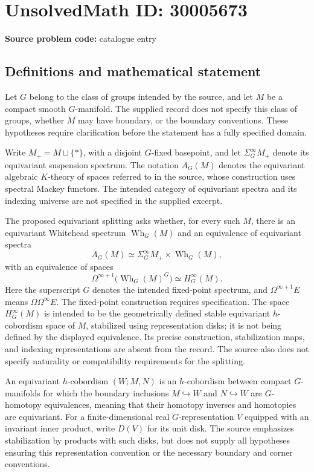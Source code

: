 \documentclass[11pt]{article}
\begin{document}
\section*{UnsolvedMath ID: 30005673}
\textbf{Source problem code:} catalogue entry
\subsection{Definitions and mathematical statement}
Let \(G\) belong to the class of groups intended by the source, and let \(M\) be a compact smooth \(G\)-manifold. The supplied record does not specify this class of groups, whether \(M\) may have boundary, or the boundary conventions. These hypotheses require clarification before the statement has a fully specified domain.

Write \(M_+=M\sqcup\{*\}\), with a disjoint \(G\)-fixed basepoint, and let \(\Sigma_G^\infty M_+\) denote its equivariant suspension spectrum. The notation \(A_G(M)\) denotes the equivariant algebraic \(K\)-theory of spaces referred to in the source, whose construction uses spectral Mackey functors. The intended category of equivariant spectra and its indexing universe are not specified in the supplied excerpt.

The proposed equivariant splitting asks whether, for every such \(M\), there is an equivariant Whitehead spectrum \(\operatorname{Wh}_G(M)\) and an equivalence of equivariant spectra
\[
 A_G(M)\simeq \Sigma_G^\infty M_+\times\operatorname{Wh}_G(M),
\]
with an equivalence of spaces
\[
 \Omega^{\infty+1}\bigl(\operatorname{Wh}_G(M)^G\bigr)
 \simeq H_G^\infty(M).
\]
Here the superscript \(G\) denotes the intended fixed-point spectrum, and \(\Omega^{\infty+1}E\) means \(\Omega\Omega^\infty E\). The fixed-point construction requires specification. The space \(H_G^\infty(M)\) is intended to be the geometrically defined stable equivariant \(h\)-cobordism space of \(M\), stabilized using representation disks; it is not being defined by the displayed equivalence. Its precise construction, stabilization maps, and indexing representations are absent from the record. The source also does not specify naturality or compatibility requirements for the splitting.

An equivariant \(h\)-cobordism \((W;M,N)\) is an \(h\)-cobordism between compact \(G\)-manifolds for which the boundary inclusions \(M\hookrightarrow W\) and \(N\hookrightarrow W\) are \(G\)-homotopy equivalences, meaning that their homotopy inverses and homotopies are equivariant. For a finite-dimensional real \(G\)-representation \(V\) equipped with an invariant inner product, write \(D(V)\) for its unit disk. The source emphasizes stabilization by products with such disks, but does not supply all hypotheses ensuring this representation convention or the necessary boundary and corner conventions.
\end{document}
